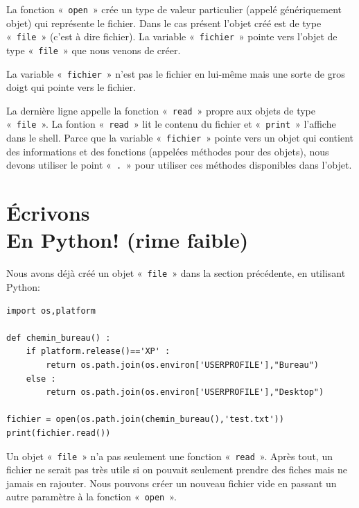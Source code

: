 La fonction « \texttt{open} »  crée un type de valeur particulier (appelé génériquement objet) qui représente le fichier. Dans le cas présent l'objet créé est de type « \texttt{file} » (c'est à dire fichier). La variable « \texttt{fichier} » pointe vers l'objet de type « \texttt{file} » que nous venons de créer.

La variable « \texttt{fichier} » n'est pas le fichier en lui-même mais une sorte de gros doigt qui pointe vers le fichier.

La dernière ligne appelle la fonction « \texttt{read} » propre aux objets de type « \texttt{file} ». La fontion « \texttt{read} » lit le contenu du fichier et « \texttt{print} » l'affiche dans le shell. Parce que la variable « \texttt{fichier} » pointe vers un objet qui contient des informations et des fonctions (appelées méthodes pour des objets), nous devons utiliser le point « \texttt{.} »  pour utiliser ces méthodes disponibles dans l'objet.

\begin{center}
\end{center}

\section{Écrivons\\
En Python! (rime faible)}

Nous avons déjà créé un objet « \texttt{file} » dans la section précédente, en utilisant Python:

\begin{Verbatim}[frame=single,rulecolor=\color{gray}, label=ne pas saisir]
import os,platform

def chemin_bureau() :
    if platform.release()=='XP' :
        return os.path.join(os.environ['USERPROFILE'],"Bureau")
    else :
        return os.path.join(os.environ['USERPROFILE'],"Desktop")
    
fichier = open(os.path.join(chemin_bureau(),'test.txt'))
print(fichier.read())
\end{Verbatim}

Un objet « \texttt{file} » n'a pas seulement une fonction « \texttt{read} ». Après tout, un fichier ne serait pas très utile si on pouvait seulement prendre des fiches mais ne jamais en rajouter. Nous pouvons créer un nouveau fichier vide en passant un autre paramètre à la fonction « \texttt{open} ».

